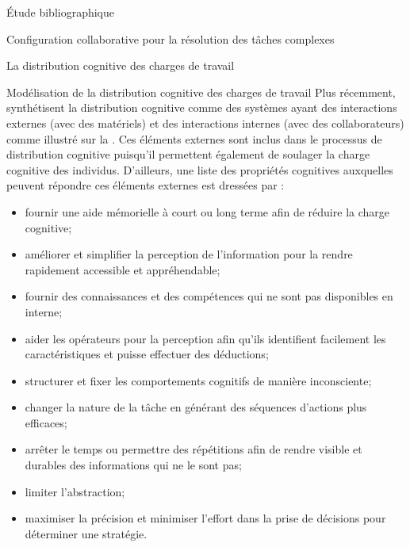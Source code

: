 \documentclass[myfrancais,ngerman,english,french]{mythesis}
\begin{document}
\begin{mychapter}{Étude bibliographique}
\begin{mysection}{Configuration collaborative pour la résolution des tâches complexes}
\begin{mysubsection}{La distribution cognitive des charges de travail}
\begin{mysubsubsection}{Modélisation de la distribution cognitive des charges de travail}
					Plus récemment,  synthétisent la distribution cognitive comme des systèmes ayant des interactions externes (avec des matériels)  et des interactions internes (avec des collaborateurs) comme illustré sur la .
					Ces éléments externes sont inclus dans le processus de distribution cognitive puisqu'il permettent également de soulager la charge cognitive des individus.
					D'ailleurs, une liste des propriétés cognitives auxquelles peuvent répondre ces éléments externes est dressées par  :
					\begin{itemize}
						\item fournir une aide mémorielle à court ou long terme afin de réduire la charge cognitive;
						\item améliorer et simplifier la perception de l'information pour la rendre rapidement accessible et appréhendable;
						\item fournir des connaissances et des compétences qui ne sont pas disponibles en interne;
						\item aider les opérateurs pour la perception afin qu'ils identifient facilement les caractéristiques et puisse effectuer des déductions;
						\item structurer et fixer les comportements cognitifs de manière inconsciente;
						\item changer la nature de la tâche en générant des séquences d'actions plus efficaces;
						\item arrêter le temps ou permettre des répétitions afin de rendre visible et durables des informations qui ne le sont pas;
						\item limiter l'abstraction;
						\item maximiser la précision et minimiser l'effort dans la prise de décisions pour déterminer une stratégie.
					\end{itemize}


\end{mysubsubsection}
\end{mysubsection}
\end{mysection}
\end{mychapter}
\end{document}
